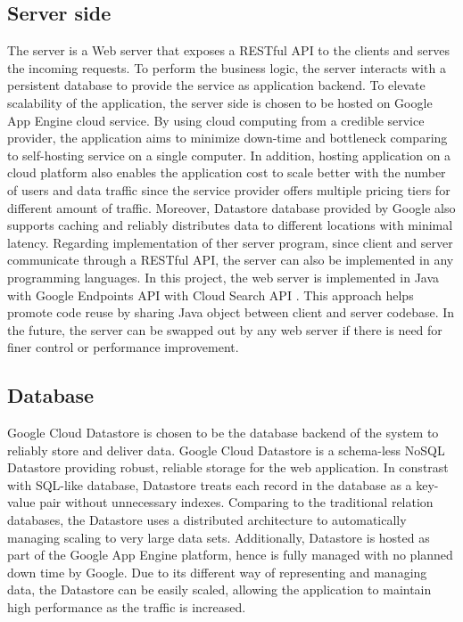 \subsection{Server side}
The server is a Web server that exposes a RESTful API to the clients and serves the incoming requests. To perform the
business logic, the server interacts with a persistent database to provide the service as application backend. To
elevate scalability of the application, the server side is chosen to be hosted on Google App Engine cloud service. By
using cloud computing from a credible service provider, the application aims to minimize down-time and bottleneck
comparing to self-hosting service on a single computer.  In addition, hosting application on a cloud platform also
enables the application cost to scale better with the number of users and data traffic since the service provider offers
multiple pricing tiers for different amount of traffic.  Moreover, Datastore database provided by Google also supports
caching and reliably distributes data to different locations with minimal latency.  Regarding implementation of ther
server program, since client and server communicate through a RESTful API, the server can also be implemented in any
programming languages. In this project, the web server is implemented in Java with Google Endpoints API
\cite{CloudEndpoints} with Cloud Search API \cite{SearchAPI}.  This approach helps promote code reuse by sharing Java
object between client and server codebase. In the future, the server can be swapped out by any web server if there is
need for finer control or performance improvement.

\subsection{Database}
Google Cloud Datastore is chosen to be the database backend of the system to reliably store and deliver data. Google
Cloud Datastore is a schema-less NoSQL Datastore providing robust, reliable storage for the web application. In
constrast with SQL-like database, Datastore treats each record in the database as a key-value pair without unnecessary
indexes. Comparing to the traditional relation databases, the Datastore uses a distributed architecture to automatically
managing scaling to very large data sets. Additionally, Datastore is hosted as part of the Google App Engine platform,
hence is fully managed with no planned down time by Google. Due to its different way of representing and managing data,
the Datastore can be easily scaled, allowing the application to maintain high performance as the traffic is increased.

